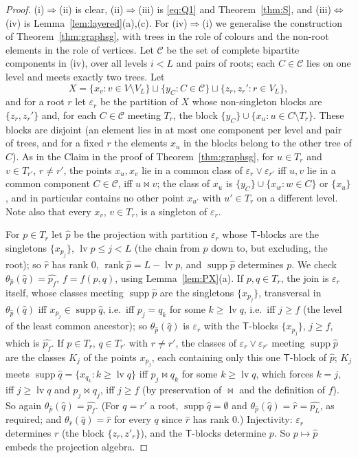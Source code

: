 \documentclass[11pt]{amsart}
\theoremstyle{definition}
\newcommand{\supp}{\operatorname{supp}}
\newcommand{\T}{\mathsf{T}}
\newcommand{\rk}{\operatorname{rank}}
\begin{document}
\begin{proof}
(i)$\Rightarrow$(ii) is clear, (ii)$\Rightarrow$(iii) is \eqref{eq:Q1} and Theorem~\ref{thm:S}, and (iii)$\Leftrightarrow$(iv) is Lemma~\ref{lem:layered}(a),(c). For (iv)$\Rightarrow$(i) we generalise the construction of Theorem~\ref{thm:graphsg}, with trees in the role of colours and the non-root elements in the role of vertices. Let $\mathcal C$ be the set of complete bipartite components in (iv), over all levels $i<L$ and pairs of roots; each $C\in\mathcal C$ lies on one level and meets exactly two trees. Let
\[
X=\{x_v: v\in V\setminus V_L\}\sqcup\{y_C:C\in\mathcal C\}\sqcup\{z_r,z_r': r\in V_L\},
\]
and for a root $r$ let $\varepsilon_r$ be the partition of $X$ whose non-singleton blocks are $\{z_r,z_r'\}$ and, for each $C\in\mathcal C$ meeting $T_r$, the block $\{y_C\}\cup\{x_u: u\in C\setminus T_r\}$. These blocks are disjoint (an element lies in at most one component per level and pair of trees, and for a fixed $r$ the elements $x_u$ in the blocks belong to the other tree of $C$). As in the Claim in the proof of Theorem~\ref{thm:graphsg}, for $u\in T_r$ and $v\in T_{r'}$, $r\ne r'$, the points $x_u,x_v$ lie in a common class of $\varepsilon_r\vee\varepsilon_{r'}$ iff $u,v$ lie in a common component $C\in\mathcal C$, iff $u\bowtie v$; the class of $x_u$ is $\{y_C\}\cup\{x_w:w\in C\}$ or $\{x_u\}$, and in particular contains no other point $x_{u'}$ with $u'\in T_r$ on a different level. Note also that every $x_v$, $v\in T_r$, is a singleton of $\varepsilon_r$.

For $p\in T_r$ let $\hat p$ be the projection with partition $\varepsilon_r$ whose $\T$-blocks are the singletons $\{x_{p_j}\}$, $\operatorname{lv}p\le j<L$ (the chain from $p$ down to, but excluding, the root); so $\hat r$ has rank $0$, $\rk\hat p=L-\operatorname{lv}p$, and $\supp\hat p$ determines $p$. We check $\theta_{\hat p}(\hat q)=\widehat{p_f}$, $f=f(p,q)$, using Lemma~\ref{lem:PX}(a). If $p,q\in T_r$, the join is $\varepsilon_r$ itself, whose classes meeting $\supp\hat p$ are the singletons $\{x_{p_j}\}$, transversal in $\theta_{\hat p}(\hat q)$ iff $x_{p_j}\in\supp\hat q$, i.e.\ iff $p_j=q_k$ for some $k\ge\operatorname{lv}q$, i.e.\ iff $j\ge f$ (the level of the least common ancestor); so $\theta_{\hat p}(\hat q)$ is $\varepsilon_r$ with the $\T$-blocks $\{x_{p_j}\}$, $j\ge f$, which is $\widehat{p_f}$. If $p\in T_r$, $q\in T_{r'}$ with $r\ne r'$, the classes of $\varepsilon_r\vee\varepsilon_{r'}$ meeting $\supp\hat p$ are the classes $K_j$ of the points $x_{p_j}$, each containing only this one $\T$-block of $\hat p$; $K_j$ meets $\supp\hat q=\{x_{q_k}:k\ge\operatorname{lv}q\}$ iff $p_j\bowtie q_k$ for some $k\ge\operatorname{lv}q$, which forces $k=j$, iff $j\ge\operatorname{lv}q$ and $p_j\bowtie q_j$, iff $j\ge f$ (by preservation of $\bowtie$ and the definition of $f$). So again $\theta_{\hat p}(\hat q)=\widehat{p_f}$. (For $q=r'$ a root, $\supp\hat q=\emptyset$ and $\theta_{\hat p}(\hat q)=\hat r=\widehat{p_L}$, as required; and $\theta_{\hat r}(\hat q)=\hat r$ for every $q$ since $\hat r$ has rank $0$.) Injectivity: $\varepsilon_r$ determines $r$ (the block $\{z_r,z'_r\}$), and the $\T$-blocks determine $p$. So $p\mapsto\hat p$ embeds the projection algebra.


\end{proof}
\end{document}
